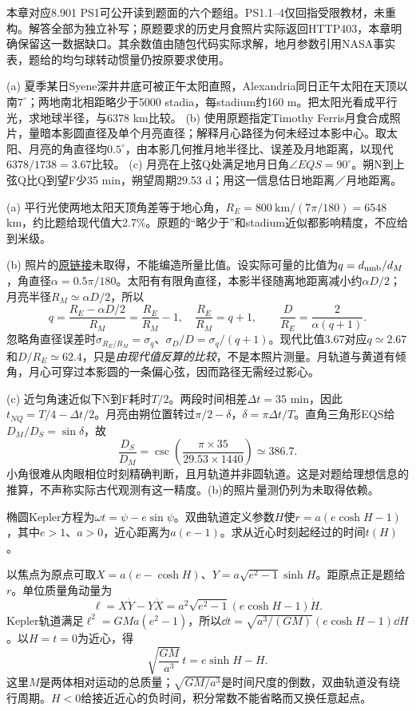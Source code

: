 本章对应8.901 PS1可公开读到题面的六个题组。PS1.1--4仅回指受限教材，未重构。解答全部为独立补写；原题要求的历史月食照片实际返回HTTP403，本章明确保留这一数据缺口。其余数值由随包代码实际求解，地月参数引用NASA事实表，题给的均匀球转动惯量仍按原要求使用。

\begin{exercise}
(a) 夏季某日Syene深井井底可被正午太阳直照，Alexandria同日正午太阳在天顶以南$7^\circ$；两地南北相距略少于5000 stadia，每stadium约160 m。把太阳光看成平行光，求地球半径，与6378 km比较。
(b) 使用原题指定Timothy Ferris月食合成照片，量暗本影圆直径及单个月亮直径；解释月心路径为何未经过本影中心。取太阳、月亮的角直径均$0.5^\circ$，由本影几何推月地半径比、误差及月地距离，以现代$6378/1738=3.67$比较。
(c) 月亮在上弦Q处满足地月日角$\angle EQS=90^\circ$。朔N到上弦Q比Q到望F少35 min，朔望周期29.53 d；用这一信息估日地距离／月地距离。
\end{exercise}
\begin{solution}
(a) 平行光使两地太阳天顶角差等于地心角，$R_E=800\ \mathrm{km}/(7\pi/180)=6548$ km，约比题给现代值大2.7\%。原题的“略少于”和stadium近似都影响精度，不应给到米级。

(b) 照片的\href{https://web.mit.edu/8.901/images/moon.png}{原链接}未取得，不能编造所量比值。设实际可量的比值为$q=d_{\rm umb}/d_M$，角直径$\alpha=0.5\pi/180$。太阳有有限角直径，本影半径随离地距离减小约$\alpha D/2$；月亮半径$R_M\simeq\alpha D/2$，所以
\[
 q=\frac{R_E-\alpha D/2}{R_M}=\frac{R_E}{R_M}-1,\quad
 \frac{R_E}{R_M}=q+1,\qquad \frac D{R_E}=\frac{2}{\alpha(q+1)}.
\]
忽略角直径误差时$\sigma_{R_E/R_M}=\sigma_q$、$\sigma_D/D=\sigma_q/(q+1)$。现代比值3.67对应$q\simeq2.67$和$D/R_E\simeq62.4$，只是\emph{由现代值反算的比较}，不是本照片测量。月轨道与黄道有倾角，月心可穿过本影圆的一条偏心弦，因而路径无需经过影心。

(c) 近匀角速近似下N到F耗时$T/2$。两段时间相差$\Delta t=35$ min，因此$t_{NQ}=T/4-\Delta t/2$。月亮由朔位置转过$\pi/2-\delta$，$\delta=\pi\Delta t/T$。直角三角形EQS给$D_M/D_S=\sin\delta$，故
\[
 \frac{D_S}{D_M}=\csc\left(\frac{\pi\times35}{29.53\times1440}\right)\simeq386.7.
\]
小角很难从肉眼相位时刻精确判断，且月轨道并非圆轨道。这是对题给理想信息的推算，不声称实际古代观测有这一精度。(b)的照片量测仍列为未取得依赖。
\end{solution}

\begin{exercise}
椭圆Kepler方程为$\omega t=\psi-e\sin\psi$。双曲轨道定义参数$H$使$r=a(e\cosh H-1)$，其中$e>1$、$a>0$，近心距离为$a(e-1)$。求从近心时刻起经过的时间$t(H)$。
\end{exercise}
\begin{solution}
以焦点为原点可取$X=a(e-\cosh H)$、$Y=a\sqrt{e^2-1}\sinh H$。距原点正是题给$r$。单位质量角动量为
\[
 \ell=X\dot Y-Y\dot X
 =a^2\sqrt{e^2-1}(e\cosh H-1)\dot H.
\]
Kepler轨道满足$\ell^2=GMa(e^2-1)$，所以$\dd t=\sqrt{a^3/(GM)}(e\cosh H-1)\dd H$。以$H=t=0$为近心，得
\[
 \sqrt{\frac{GM}{a^3}}\,t=e\sinh H-H.
\]
这里$M$是两体相对运动的总质量；$\sqrt{GM/a^3}$是时间尺度的倒数，双曲轨道没有绕行周期。$H<0$给接近近心的负时间，积分常数不能省略而又换任意起点。
\end{solution}

